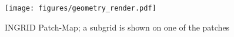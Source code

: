 


\begin{figure}[H]
    \centering
    \texttt{[image: figures/geometry\_render.pdf]}  %
    \caption{INGRID Patch-Map; a subgrid is shown on one of the patches}
    \label{fig:patchmap_subgrid}
\end{figure}





